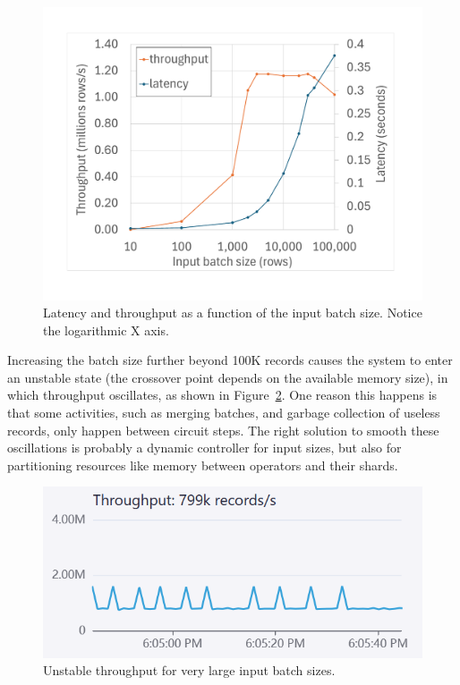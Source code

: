 \begin{figure}[h]
  \includegraphics[width=.90\columnwidth]{graph/batchsize}
  \caption{Latency and throughput as a function of the input batch
    size.  Notice the logarithmic X axis.\label{fig:batchsize}}
\end{figure}

Increasing the batch size further beyond 100K records causes the
system to enter an unstable state (the crossover point depends on the
available memory size), in which throughput oscillates, as shown in
Figure~\ref{fig:oscillation}.  One reason this happens is that some
activities, such as merging batches, and garbage collection of useless
records, only happen between circuit steps.  The right solution to
smooth these oscillations is probably a dynamic controller for input
sizes, but also for partitioning resources like memory between \dbsp
operators and their shards.

\begin{figure}[h]
  \begin{center}
  \includegraphics[scale=.5]{graph/oscillation}
  \caption{Unstable throughput for very large input batch
    sizes\label{fig:oscillation}.}
  \end{center}
\end{figure}

